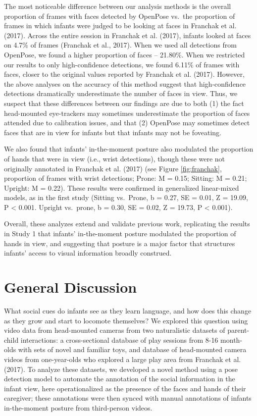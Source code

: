 \documentclass[english,man]{apa6}
\begin{document}
The most noticeable difference between our analysis methods is the
overall proportion of frames with faces detected by OpenPose vs.~the
proportion of frames in which infants were judged to be looking at faces
in Franchak et al. (2017). Across the entire session in Franchak et al.
(2017), infants looked at faces on 4.7\% of frames (Franchak et al.,
2017). When we used all detections from OpenPose, we found a higher
proportion of faces -- 21.80\%. When we restricted our results to only
high-confidence detections, we found 6.11\% of frames with faces, closer
to the original values reported by Franchak et al. (2017). However, the
above analyses on the accuracy of this method suggest that
high-confidence detections dramatically underestimate the number of
faces in view. Thus, we suspect that these differences between our
findings are due to both (1) the fact head-mounted eye-trackers may
sometimes underestimate the proportion of faces attended due to
calibration issues, and that (2) OpenPose may sometimes detect faces
that are in view for infants but that infants may not be foveating.

We also found that infants' in-the-moment posture also modulated the
proportion of hands that were in view (i.e., wrist detections), though
these were not originally annotated in Franchak et al. (2017) (see
Figure \ref{fig:franchak}, proportion of frames with wrist detections;
Prone: M = 0.15; Sitting: M = 0.21; Upright: M = 0.22). These results
were confirmed in generalized linear-mixed models, as in the first study
(Sitting vs.~Prone, b = 0.27, SE = 0.01, Z = 19.09, P \textless{} 0.001.
Upright vs.~prone, b = 0.30, SE = 0.02, Z = 19.73, P \textless{} 0.001).

Overall, these analyzes extend and validate previous work, replicating
the results in Study 1 that infants' in-the-moment posture modulated the
proportion of hands in view, and suggesting that posture is a major
factor that structures infants' access to visual information broadly
construed.

\section{General Discussion}\label{general-discussion}

What social cues do infants see as they learn language, and how does
this change as they grow and start to locomote themselves? We explored
this question using video data from head-mounted cameras from two
naturalistic datasets of parent-child interactions: a cross-sectional
database of play sessions from 8-16 month-olds with sets of novel and
familiar toys, and database of head-mounted camera videos from
one-year-olds who explored a large play area from Franchak et al.
(2017). To analyze these datasets, we developed a novel method using a
pose detection model to automate the annotation of the social
information in the infant view, here operationalized as the presence of
the faces and hands of their caregiver; these annotations were then
synced with manual annotations of infants in-the-moment posture from
third-person videos.
\end{document}
